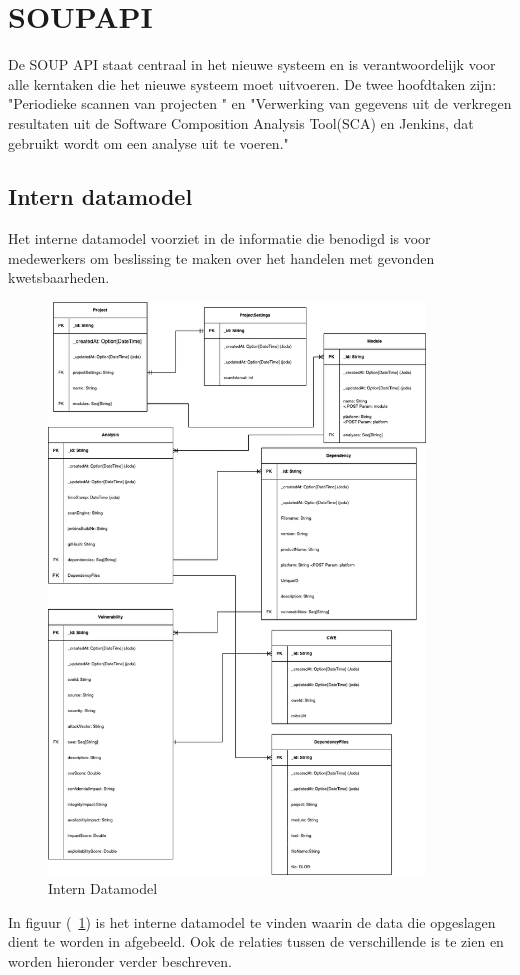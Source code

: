 \section{SOUPAPI}\label{sec:soupapi}
De SOUP API staat centraal in het nieuwe systeem en is verantwoordelijk voor alle kerntaken die het nieuwe systeem moet uitvoeren. De twee hoofdtaken zijn: "Periodieke scannen van projecten " en "Verwerking van gegevens uit de verkregen resultaten uit de Software Composition Analysis Tool(SCA) en Jenkins, dat gebruikt wordt om een analyse uit te voeren."

\subsection{Intern datamodel}\label{subsec:intern-datamodel}
Het interne datamodel voorziet in de informatie die benodigd is voor medewerkers om beslissing te maken over het handelen met gevonden kwetsbaarheden.

\begin{figure}[bth]
    \myfloatalign
    \includegraphics[width=10cm]{gfx/SOUPAPI-SOUPAPI DM}
    \caption{Intern Datamodel}
    \label{fig:SOUP-SoupApiDm}
\end{figure}
In figuur (~\ref{fig:SOUP-SoupApiDm}) is het interne datamodel te vinden waarin de data die opgeslagen dient te worden in afgebeeld. Ook de relaties tussen de verschillende is te zien en worden hieronder verder beschreven.


